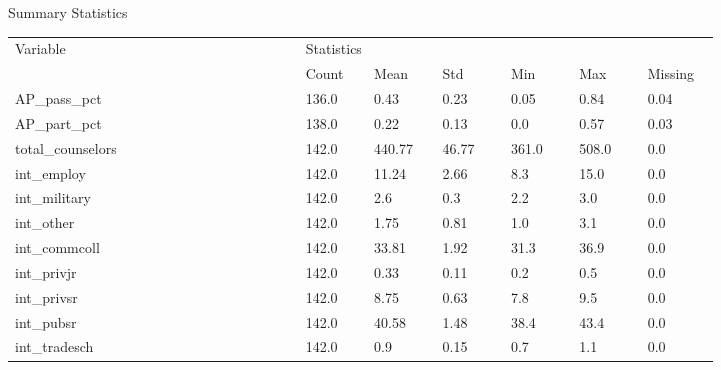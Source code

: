 \begin{threeparttable}
    \caption{Summary Statistics} %
\label{tab:summarystats1} %
    \begin{tabular}{ p{0.34\linewidth} p{0.08\linewidth} p{0.08\linewidth} p{0.08\linewidth} p{0.08\linewidth} p{0.08\linewidth} p{0.08\linewidth}}     %
    \toprule %
    Variable                        & \multicolumn{6}{l}{Statistics} \\ %

                       \cmidrule(r){2-7} %
                                    &    Count   &   Mean & Std & Min & Max & Missing  \\ 
\midrule 

 AP\_pass\_pct &  136.0  &  0.43 & 0.23 & 0.05 & 0.84 & 0.04  \\ 
 AP\_part\_pct &  138.0  &  0.22 & 0.13 & 0.0 & 0.57 & 0.03  \\ 
 total\_counselors &  142.0  &  440.77 & 46.77 & 361.0 & 508.0 & 0.0  \\ 
 int\_employ &  142.0  &  11.24 & 2.66 & 8.3 & 15.0 & 0.0  \\ 
 int\_military &  142.0  &  2.6 & 0.3 & 2.2 & 3.0 & 0.0  \\ 
 int\_other &  142.0  &  1.75 & 0.81 & 1.0 & 3.1 & 0.0  \\ 
 int\_commcoll &  142.0  &  33.81 & 1.92 & 31.3 & 36.9 & 0.0  \\ 
 int\_privjr &  142.0  &  0.33 & 0.11 & 0.2 & 0.5 & 0.0  \\ 
 int\_privsr &  142.0  &  8.75 & 0.63 & 7.8 & 9.5 & 0.0  \\ 
 int\_pubsr &  142.0  &  40.58 & 1.48 & 38.4 & 43.4 & 0.0  \\ 
 int\_tradesch &  142.0  &  0.9 & 0.15 & 0.7 & 1.1 & 0.0  \\ 
\midrule
\end{tabular}

\end{threeparttable}